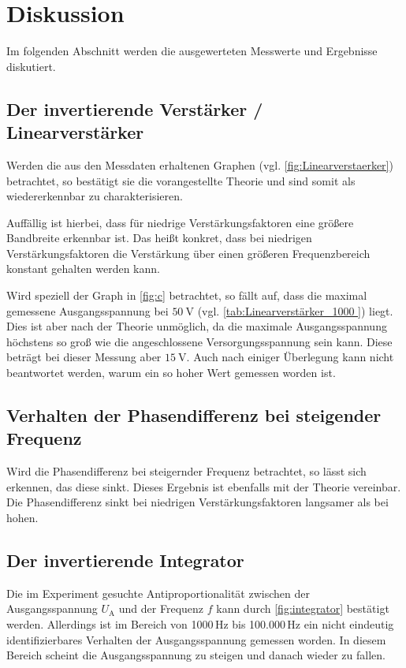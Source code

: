 \newpage
\section{Diskussion}
Im folgenden Abschnitt werden die ausgewerteten Messwerte und Ergebnisse diskutiert.

\subsection{Der invertierende Verstärker / Linearverstärker}
Werden die aus den Messdaten erhaltenen Graphen (vgl. \autoref{fig:Linearverstaerker})
betrachtet, so bestätigt sie die vorangestellte Theorie und sind somit als 
wiedererkennbar zu charakterisieren. 

Auffällig ist hierbei, dass für niedrige Verstärkungsfaktoren eine größere Bandbreite erkennbar ist.
Das heißt konkret, dass bei niedrigen Verstärkungsfaktoren die Verstärkung über einen
größeren Frequenzbereich konstant gehalten werden kann.

Wird speziell der Graph in \autoref{fig:c} betrachtet, so fällt auf, dass die 
maximal gemessene Ausgangsspannung bei $\SI{50}{\volt}$ (vgl. \autoref{tab:Linearverstärker_1000 }) liegt. 
Dies ist aber nach der Theorie unmöglich, da die maximale Ausgangsspannung höchstens so groß wie 
die angeschlossene Versorgungsspannung sein kann. 
Diese beträgt bei dieser Messung aber $\SI{15}{\volt}$. 
Auch nach einiger Überlegung kann nicht beantwortet werden, warum ein so hoher Wert gemessen worden ist.

\subsection{Verhalten der Phasendifferenz bei steigender Frequenz}
Wird die Phasendifferenz bei steigernder Frequenz betrachtet, so lässt sich erkennen, das diese sinkt. 
Dieses Ergebnis ist ebenfalls mit der Theorie vereinbar.
Die Phasendifferenz sinkt bei niedrigen Verstärkungsfaktoren langsamer als bei hohen.

\subsection{Der invertierende Integrator}
Die im Experiment gesuchte Antiproportionalität zwischen der Ausgangsspannung $U_\text{A}$ und der Frequenz
$f$ kann durch \autoref{fig:integrator} bestätigt werden.
Allerdings ist im Bereich von 1000\,Hz bis 100.000\,Hz ein nicht eindeutig identifizierbares 
Verhalten der Ausgangsspannung gemessen worden. 
In diesem Bereich scheint die Ausgangsspannung zu steigen und danach wieder zu fallen.

